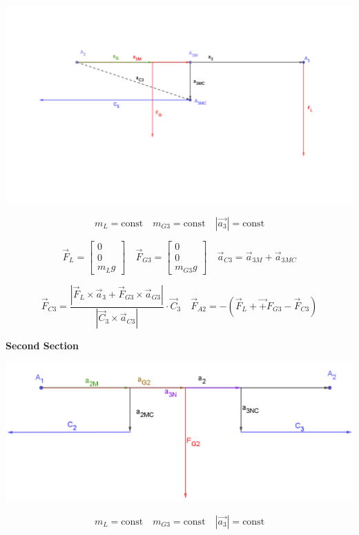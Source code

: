\documentclass{article}
\newcommand{\vect}[1]{\left[\begin{array}{c}#1\end{array}\right]}
\begin{document}
        \begin{center}
            \includegraphics[scale=0.5]{images/Section3.PNG}
        \end{center}
        
        \begin{equation}
            m_L = \text{const} \quad m_{G3} = \text{const} \quad |\vec{a_3}| = \text{const}
        \end{equation}
        
        \begin{equation}
            \vec F_L = \vect{ 0 \\ 0 \\ m_L g} \quad \vec F_{G3} = \vect{ 0 \\ 0 \\ m_{G3} g} \quad \vec a_{C3} = \vec a_{3M} + \vec a_{3MC}
        \end{equation}
        
        \begin{equation}
            \vec F_{C3} = \frac{| \vec F_L \times \vec a_3 + \vec F_{G3} \times \vec a_{G3}|}{| \vec C_3 \times \vec a_{C3} |} \cdot \vec C_3 \quad
            \vec F_{A2} = - ( \vec F_L + \vec + F_{G3} - \vec F_{C3} )
        \end{equation}
    
    \textbf{Second Section}
    
        \begin{center}
            \includegraphics[scale=0.5]{images/Section2.PNG}
        \end{center}
        
        \begin{equation}
            m_L = \text{const} \quad m_{G3} = \text{const} \quad |\vec{a_3}| = \text{const}
        \end{equation}
\end{document}
